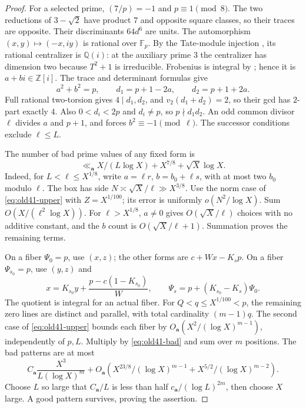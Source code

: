 \begin{proof}
For a selected prime, $(7/p)=-1$ and $p\equiv1\pmod8$. The two
reductions of $3-\sqrt2$ have product $7$ and opposite square classes,
so their traces are opposite. Their discriminants $64d^6$ are units.
The automorphism $(x,y)\mapsto(-x,iy)$ is rational over $\mathbb F_p$.
By the Tate-module injection \cite[III.7.4]{silverman}, its rational
centralizer is $\mathbb Q(i)$: at the auxiliary prime $3$ the
centralizer has dimension two because $T^2+1$ is irreducible.
Frobenius is integral by \cite[V.2.3.1(b)]{silverman}; hence it is
$a+bi\in\mathbb Z[i]$. The trace and determinant formulas
\cite[III.8.6]{silverman} give
\[
 a^2+b^2=p,\qquad d_1=p+1-2a,\qquad d_2=p+1+2a.
\]
Full rational two-torsion gives $4\mid d_1,d_2$, and
$v_2(d_1+d_2)=2$, so their gcd has $2$-part exactly $4$.
Also $0<d_i<2p$ and $d_i\ne p$, so $p\nmid d_1d_2$.
An odd common divisor $\ell$ divides $a$ and $p+1$, and forces
$b^2\equiv-1\pmod\ell$. The successor conditions exclude $\ell\le L$.

The number of bad prime values of any fixed form is
\begin{equation}\label{eq:old41-bad}
 \ll_{\mathbf a}X/(L\log X)+X^{7/8}+\sqrt X\log X.
\end{equation}
Indeed, for $L<\ell\le X^{1/8}$, write
$a=\ell r$, $b=b_0+\ell s$, with at most two $b_0$ modulo $\ell$.
The box has side $N\asymp\sqrt X/\ell\gg X^{3/8}$.
Use the norm case of \eqref{eq:old41-upper} with $Z=X^{1/100}$;
its error is uniformly $o(N^2/\log X)$. Sum
$O(X/(\ell^2\log X))$. For $\ell>X^{1/8}$, $a\ne0$ gives
$O(\sqrt X/\ell)$ choices with no additive constant, and the
$b$ count is $O(\sqrt X/\ell+1)$. Summation proves the remaining terms.

On a fiber $\Psi_0=p$, use $(x,z)$; the other forms are
$c+Wx-K_s p$. On a fiber $\Psi_{s_0}=p$, use $(y,z)$ and
\[
 x=K_{s_0}y+\frac{p-c(1-K_{s_0})}{W},\qquad
 \Psi_s=p+(K_{s_0}-K_s)\Psi_0.
\]
The quotient is integral for an actual fiber. For
$Q<q\le X^{1/100}<p$, the remaining zero lines are distinct and
parallel, with total cardinality $(m-1)q$. The second case of
\eqref{eq:old41-upper} bounds each fiber by
$O_{\mathbf a}(X^2/(\log X)^{m-1})$, independently of $p,L$.
Multiply by \eqref{eq:old41-bad} and sum over $m$ positions.
The bad patterns are at most
\[
 C_{\mathbf a}\frac{X^3}{L(\log X)^m}
 +O_{\mathbf a}\left(
 X^{23/8}/(\log X)^{m-1}+X^{5/2}/(\log X)^{m-2}\right).
\]
Choose $L$ so large that $C_{\mathbf a}/L$ is less than half
$c_{\mathbf a}/(\log L)^{2m}$, then choose $X$ large.
A good pattern survives, proving the assertion.
\end{proof}

